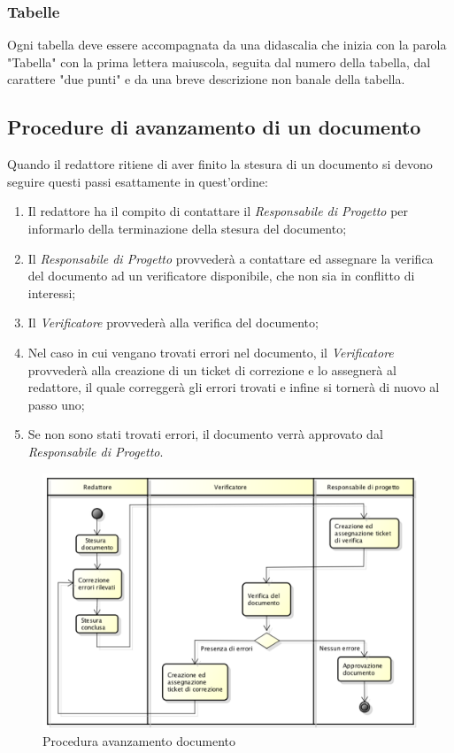 \subsubsection{Tabelle}
Ogni tabella deve essere accompagnata da una didascalia che inizia con la parola "Tabella" con la prima lettera maiuscola, seguita dal numero della tabella, dal carattere "due punti" e da una breve descrizione non banale della tabella.

\subsection{Procedure di avanzamento di un documento}
Quando il redattore ritiene di aver finito la stesura di un documento si devono seguire questi passi esattamente in quest'ordine:
\begin{enumerate}
	\item Il redattore ha il compito di contattare il \textit{Responsabile di Progetto} per informarlo della terminazione della stesura del documento;
	\item Il \textit{Responsabile di Progetto} provvederà a contattare ed assegnare la verifica del documento ad un verificatore disponibile, che non sia in conflitto di interessi;
	\item Il \textit{Verificatore} provvederà alla  verifica del documento;
	\item Nel caso in cui vengano trovati errori nel documento, il \textit{Verificatore} provvederà alla creazione di un ticket di correzione e lo assegnerà al redattore, il quale correggerà gli errori trovati e infine si tornerà di nuovo al passo uno;
	\item Se non sono stati trovati errori, il documento verrà approvato dal \textit{Responsabile di Progetto}. 
\end{enumerate}
\begin{figure}[h]
\centering
\includegraphics[width=0.9\linewidth]{img/proceduraDocumenti}
\caption[Procedura avanzamento documento]{Procedura avanzamento documento}
\label{fig:proceduraDocumenti}
\end{figure}




